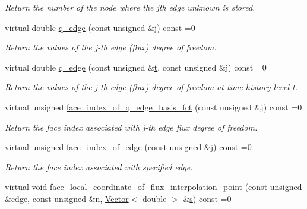 \begin{DoxyCompactItemize}
\begin{DoxyCompactList}\small\item\em Return the number of the node where the jth edge unknown is stored. \end{DoxyCompactList}\item 
virtual double \hyperlink{classoomph_1_1AxisymmetricPoroelasticityEquations_adf0d3ac9623d62b353e44e82984cf01f}{q\+\_\+edge} (const unsigned \&j) const =0
\begin{DoxyCompactList}\small\item\em Return the values of the j-\/th edge (flux) degree of freedom. \end{DoxyCompactList}\item 
virtual double \hyperlink{classoomph_1_1AxisymmetricPoroelasticityEquations_a8e5f2e3dbc4711493ca9eb80a9ee3911}{q\+\_\+edge} (const unsigned \&\hyperlink{cfortran_8h_af6f0bd3dc13317f895c91323c25c2b8f}{t}, const unsigned \&j) const =0
\begin{DoxyCompactList}\small\item\em Return the values of the j-\/th edge (flux) degree of freedom at time history level t. \end{DoxyCompactList}\item 
virtual unsigned \hyperlink{classoomph_1_1AxisymmetricPoroelasticityEquations_a69ee55cdbcfc2db8593ff8f6ea8fd58d}{face\+\_\+index\+\_\+of\+\_\+q\+\_\+edge\+\_\+basis\+\_\+fct} (const unsigned \&j) const =0
\begin{DoxyCompactList}\small\item\em Return the face index associated with j-\/th edge flux degree of freedom. \end{DoxyCompactList}\item 
virtual unsigned \hyperlink{classoomph_1_1AxisymmetricPoroelasticityEquations_a737af4275bd48577f6ea4ca7cef1f73c}{face\+\_\+index\+\_\+of\+\_\+edge} (const unsigned \&j) const =0
\begin{DoxyCompactList}\small\item\em Return the face index associated with specified edge. \end{DoxyCompactList}\item 
virtual void \hyperlink{classoomph_1_1AxisymmetricPoroelasticityEquations_a5e84b1b9a6baa7b5fa83ad32c2734cfb}{face\+\_\+local\+\_\+coordinate\+\_\+of\+\_\+flux\+\_\+interpolation\+\_\+point} (const unsigned \&edge, const unsigned \&n, \hyperlink{classoomph_1_1Vector}{Vector}$<$ double $>$ \&\hyperlink{cfortran_8h_ab7123126e4885ef647dd9c6e3807a21c}{s}) const =0

\end{DoxyCompactItemize}
